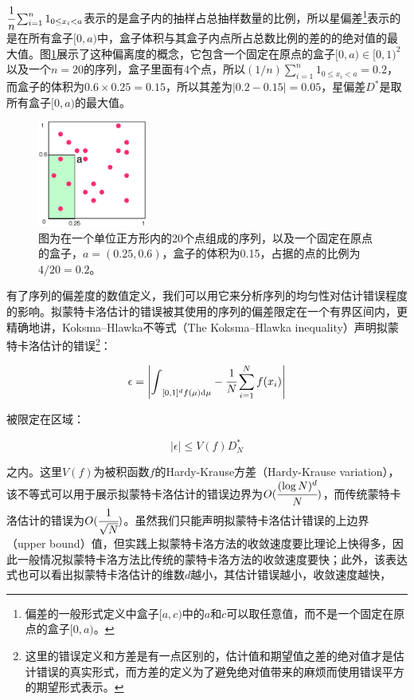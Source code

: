 \noindent $ \cfrac{1}{n}\sum^{n}_{i=1}1_{0\leq x_i<a}$表示的是盒子内的抽样占总抽样数量的比例，所以星偏差\footnote{偏差的一般形式定义中盒子$[a,c)$中的$a$和$c$可以取任意值，而不是一个固定在原点的盒子$[0,a)$。}表示的是在所有盒子$[0,a)$中，盒子体积与其盒子内点所占总数比例的差的的绝对值的最大值。图\ref{f:mc-discrepancy}展示了这种偏离度的概念，它包含一个固定在原点的盒子$[0,a)\in [0,1)^2$以及一个$n=20$的序列，盒子里面有4个点，所以$(1/n)\sum^{n}_{i=1}1_{0\leq x_i<a}=0.2$，而盒子的体积为$0.6\times 0.25=0.15$，所以其差为$|0.2-0.15|=0.05$，星偏差$D^{*}$是取所有盒子$[0,a)$的最大值。

\begin{figure}
	\sidecaption
	\includegraphics[width=0.32\textwidth]{figures/mc/discrepancy}
	\caption{图为在一个单位正方形内的20个点组成的序列，以及一个固定在原点的盒子，$a=(0.25,0.6)$，盒子的体积为0.15，占据的点的比例为$4/20=0.2$。}
	\label{f:mc-discrepancy}
\end{figure}

有了序列的偏差度的数值定义，我们可以用它来分析序列的均匀性对估计错误程度的影响。拟蒙特卡洛估计的错误被其使用的序列的偏差限定在一个有界区间内，更精确地讲，Koksma–Hlawka不等式（The Koksma–Hlawka inequality）声明拟蒙特卡洛估计的错误\footnote{这里的错误定义和方差是有一点区别的，估计值和期望值之差的绝对值才是估计错误的真实形式，而方差的定义为了避免绝对值带来的麻烦而使用错误平方的期望形式表示。}：

\begin{equation}
	\epsilon=\Bigg| {\rm \int}_{[0,1]^{d}f(\mu){\rm d}\mu}- \cfrac{1}{N}\sum^{N}_{i=1}f(x_i) \Bigg|
\end{equation}

\noindent 被限定在区域：

\begin{equation}
	|\epsilon |\leq V(f)D^{*}_{N}
\end{equation}

\noindent 之内。这里$V(f)$为被积函数$f$的Hardy-Krause方差（Hardy-Krause variation），该不等式可以用于展示拟蒙特卡洛估计的错误边界为$O( \cfrac{(\log{N})^{d}}{N})$，而传统蒙特卡洛估计的错误为$O( \cfrac{1}{\sqrt{N}})$。虽然我们只能声明拟蒙特卡洛估计错误的上边界（upper bound）值，但实践上拟蒙特卡洛方法的收敛速度要比理论上快得多，因此一般情况拟蒙特卡洛方法比传统的蒙特卡洛方法的收敛速度要快；此外，该表达式也可以看出拟蒙特卡洛估计的维数$d$越小，其估计错误越小，收敛速度越快，





